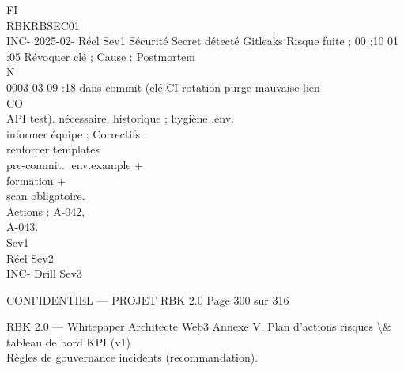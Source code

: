 \documentclass[12pt,landscape,a4paper]{article}
\newenvironment{confidential}
{\begin{tcolorbox}[
    colback=rbkred!5!white,
    colframe=rbkred!75!black,
    title=CONFIDENTIEL,
    fonttitle=\bfseries\color{white},
    coltitle=rbkred!75!black,
    breakable,
    enhanced,
    frame hidden,
    borderline west={2pt}{0pt}{rbkred!75!black}
]}
{\end{tcolorbox}}
\begin{document}
\vspace{0.5em}
\vspace{0.5em}
\vspace{0.5em}
\vspace{0.5em}
FI\\
RBKRBSEC01\\
INC-   2025-02- Réel    Sev1    Sécurité Secret détecté   Gitleaks     Risque fuite ; 00 :10 01 :05 Révoquer clé ;    Cause :           Postmortem\\
\vspace{0.5em}
\vspace{0.5em}
\vspace{0.5em}
\vspace{0.5em}
N\\
0003   03 09 :18                         dans commit (clé CI           rotation                     purge             mauvaise          lien\\
\vspace{0.5em}
CO\\
API test).                    nécessaire.                  historique ;      hygiène .env.\\
informer équipe ; Correctifs :\\
renforcer         templates\\
pre-commit.       .env.example +\\
formation +\\
scan obligatoire.\\
Actions : A-042,\\
A-043.\\
Sev1\\
Réel    Sev2\\
INC-            Drill   Sev3\\
\vspace{0.5em}
\vspace{0.5em}
\vspace{0.5em}
\vspace{0.5em}
\begin{confidential}CONFIDENTIEL — PROJET RBK 2.0                                           Page 300 sur 316\end{confidential}
RBK 2.0 — Whitepaper Architecte Web3                                                                                         Annexe V. Plan d’actions risques \textbackslash{}& tableau de bord KPI (v1)\\
\vspace{0.5em}
\vspace{0.5em}
Règles de gouvernance incidents (recommandation).\\
\end{document}

